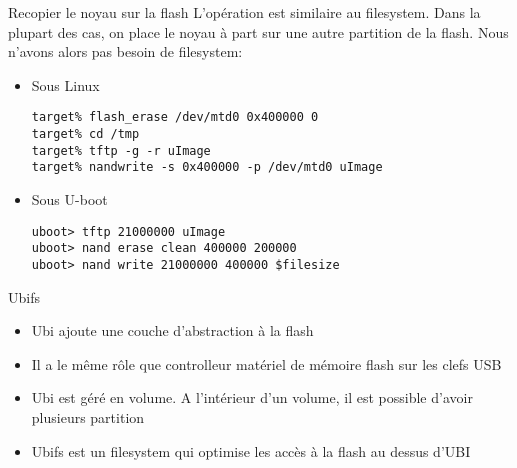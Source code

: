 \begin{frame}[fragile=singleslide]{Recopier le noyau sur la flash}
  L'opération est similaire au filesystem. Dans la plupart des cas, on
  place le  noyau à  part sur  une autre partition  de la  flash. Nous
  n'avons alors pas besoin de filesystem:
  \begin{itemize}
  \item Sous Linux
    \begin{lstlisting}
target% flash_erase /dev/mtd0 0x400000 0
target% cd /tmp
target% tftp -g -r uImage
target% nandwrite -s 0x400000 -p /dev/mtd0 uImage
    \end{lstlisting}
  \item Sous U-boot
    \begin{lstlisting}
uboot> tftp 21000000 uImage
uboot> nand erase clean 400000 200000
uboot> nand write 21000000 400000 $filesize
    \end{lstlisting}
  \end{itemize}
\end{frame}


\begin{frame}[fragile=singleslide]{Ubifs}
  \begin{itemize}
  \item Ubi ajoute une couche d'abstraction à la flash
  \item Il a le même rôle que controlleur matériel de mémoire flash sur les clefs USB
  \item Ubi est géré en volume. A l'intérieur d'un volume, il est possible d'avoir plusieurs partition
  \item Ubifs est un filesystem qui optimise les accès à la flash au dessus d'UBI
  \end{itemize}
\end{frame}

